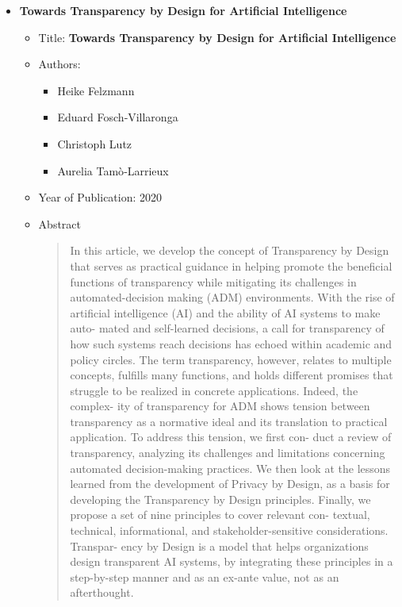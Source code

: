 \documentclass{article}
\begin{document}
\begin{itemize}
        \item \textbf{Towards Transparency by Design for Artificial Intelligence}
        \begin{itemize}
            \item Title: \textbf{Towards Transparency by Design for Artificial Intelligence}
            \item Authors:
            \begin{itemize}
                \item Heike Felzmann
                \item Eduard Fosch‑Villaronga
                \item Christoph Lutz
                \item Aurelia Tamò‑Larrieux
            \end{itemize}
            \item Year of Publication: 2020
            \item Abstract
            \begin{abstract}
                In  this  article,  we  develop  the  concept  of  Transparency  by  Design  that  serves  as  
                practical guidance in helping promote the beneficial functions of transparency while  
                mitigating its challenges in automated-decision making (ADM) environments. With 
                the  rise  of  artificial  intelligence  (AI)  and  the  ability  of  AI  systems  to  make  auto-
                mated and self-learned decisions, a call for transparency of how such systems reach 
                decisions  has  echoed  within  academic  and  policy  circles.  The  term  transparency,  
                however,  relates  to  multiple  concepts,  fulfills  many  functions,  and  holds  different  
                promises that struggle to be realized in concrete applications. Indeed, the complex-
                ity  of  transparency  for  ADM  shows  tension  between  transparency  as  a  normative  
                ideal and its translation to practical application. To address this tension, we first con-
                duct  a  review  of  transparency,  analyzing  its  challenges  and  limitations  concerning  
                automated decision-making practices. We then look at the lessons learned from the 
                development  of  Privacy  by  Design,  as  a  basis  for  developing  the  Transparency  by  
                Design principles. Finally, we propose a set of nine principles to cover relevant con-
                textual, technical, informational, and stakeholder-sensitive considerations. Transpar-
                ency  by  Design  is  a  model  that  helps  organizations  design  transparent  AI  systems,  
                by integrating these principles in a step-by-step manner and as an ex-ante value, not 
                as an afterthought.
            \end{abstract}
        \end{itemize}
    \end{itemize}
    
\end{document}
